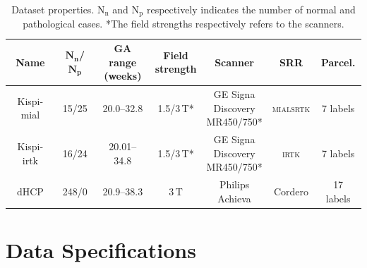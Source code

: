 \begin{table}[htbp]
    \centering
    \begin{tabular}{c|c|c|c|c|c|c}
        \toprule
        \textbf{Name} & $\textbf{N}_\textbf{n}$\textbf{/}$\textbf{N}_\textbf{p}$ & \makecell{\textbf{GA range} \\ \textbf{(weeks)}} & \makecell{\textbf{Field} \\ \textbf{strength}} & \textbf{Scanner} & \textbf{SRR} & \textbf{Parcel.} \\ \midrule
        Kispi-mial & 15/25 & 20.0--32.8 & 1.5/3\,T* & \makecell{GE Signa \\ Discovery \\ MR450/750*} & \textsc{mialsrtk} & 7 labels \\ \hline
        Kispi-irtk & 16/24 & 20.01--34.8 & 1.5/3\,T* & \makecell{GE Signa \\ Discovery \\ MR450/750*} & \textsc{irtk} & 7 labels \\ \hline
        dHCP & 248/0 & 20.9--38.3 & 3\,T & \makecell{Philips \\ Achieva} & Cordero & 17 labels \\
        \bottomrule
    \end{tabular}
    \caption{Dataset properties. $\text{N}_\text{n}$ and $\text{N}_\text{p}$ respectively indicates the number of normal and pathological cases. *The field strengths respectively refers to the scanners.}
    \label{tab:datasets}
\end{table}

\section{Data Specifications}
